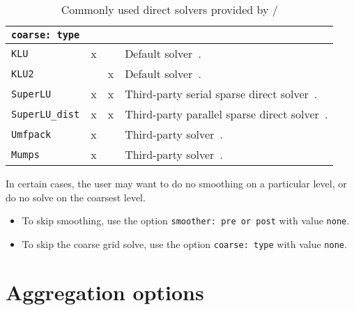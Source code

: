 \begin{table}[tbh]
  \begin{center}
    \begin{tabular}{p{4.0cm} c c p{7cm}}
      \toprule
      \texttt{coarse: type}             & \amesos{} & \amesostwo{} &  \\
      \midrule
      \verb|KLU|                        & x & & Default \amesos{} solver~\cite{klu}. \\
      \verb|KLU2|                       & & x & Default \amesostwo{} solver~\cite{amesos2_belos}. \\
      \verb|SuperLU|                    & x & x & Third-party serial sparse direct solver~\cite{Li2011}. \\
      \verb|SuperLU_dist|               & x & x & Third-party parallel sparse direct solver~\cite{Li2011}. \\
      \verb|Umfpack|                    & x & & Third-party solver~\cite{umfpack}. \\
      \verb|Mumps|                      & x & & Third-party solver~\cite{mumps}. \\
      \bottomrule
    \end{tabular}
    \caption{Commonly used direct solvers provided by \amesos{}/\amesostwo{}}
\label{tab:coarse_solvers}
  \end{center}
\end{table}

In certain cases, the user may want to do no smoothing on a particular level, or do no solve on the coarsest level.
\begin{itemize}
  \item To skip smoothing, use the option \verb!smoother: pre or post! with value \verb!none!.
  \item To skip the coarse grid solve, use the option \verb!coarse: type! with value \verb!none!.
\end{itemize}



\section{Aggregation options}
\label{sec:options_aggregation}

